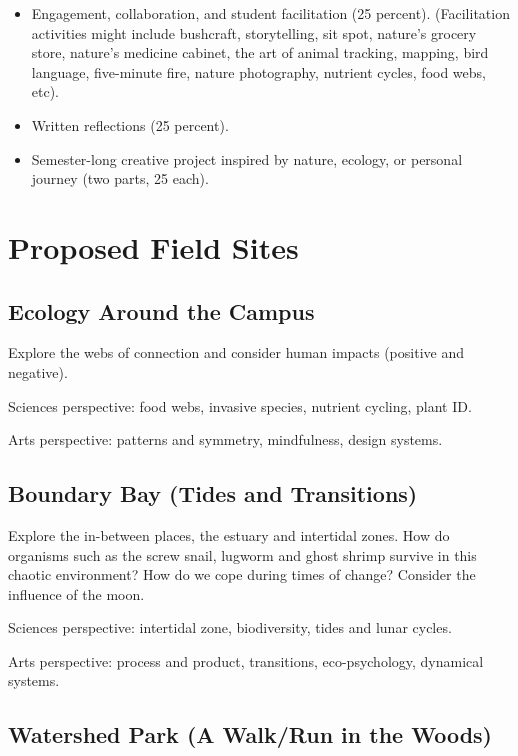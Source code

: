 \documentclass[12pt, letterpaper]{article}
\begin{document}
\begin{itemize}
\item
  Engagement, collaboration, and student facilitation (25 percent).
  (Facilitation activities might include bushcraft, storytelling, sit
  spot, nature's grocery store, nature's medicine cabinet, the art of
  animal tracking, mapping, bird language, five-minute fire, nature
  photography, nutrient cycles, food webs, etc).
\item
  Written reflections (25 percent).
\item
  Semester-long creative project inspired by nature, ecology, or
  personal journey (two parts, 25 each).
\end{itemize}

\section{Proposed Field Sites}

\subsection{Ecology Around the Campus}

Explore the webs of connection and consider human impacts (positive and
negative).

Sciences perspective: food webs, invasive species, nutrient cycling, plant ID.

Arts perspective: patterns and symmetry, mindfulness, design systems.

\subsection{Boundary Bay (Tides and Transitions)}

Explore the in-between places, the estuary and intertidal zones. How do
organisms such as the screw snail, lugworm and ghost shrimp survive in
this chaotic environment? How do we cope during times of change?
Consider the influence of the moon.

Sciences perspective: intertidal zone, biodiversity, tides and lunar cycles.

Arts perspective: process and product, transitions, eco-psychology, dynamical systems.

\subsection{Watershed Park (A Walk/Run in the Woods)}
\end{document}
